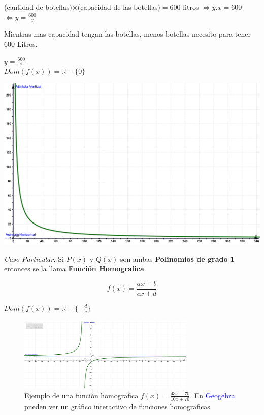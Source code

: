 \documentclass[a4paper,11pt,spanish,sans]{exam}
\begin{document}
(cantidad de botellas)$\times$(capacidad de las botellas)$=600$ litros $\Rightarrow y.x=600$ $\Leftrightarrow y=\frac{600}{x}$

Mientras mas capacidad tengan las botellas, menos botellas necesito para tener $600$ Litros.

\begin{minipage}{0.3\linewidth}

\centering
$y=\frac{600}{x} $\\
$Dom(f(x))=\mathbb{R} - \lbrace 0 \rbrace$\\


\end{minipage}
\begin{minipage}{0.7\linewidth}

\centering
\includegraphics[width= 0.8\linewidth]{inversaej.png}\\

\end{minipage}


\label{homografica}
\emph{Caso Particular:} Si $P(x)$ y $Q(x)$ son ambas \textbf{Polinomios de grado 1} entonces se la llama \textbf{Función Homografica}.

\[f(x) = \frac{a x + b}{c x + d}\]
\begin{flushright}
$Dom(f(x))=\mathbb{R} - \lbrace -\frac{d}{c}\rbrace$
\end{flushright}

\begin{figure}[ht!]
\centering
\includegraphics[width=0.75\textwidth]{homograficaej.png}
\caption{Ejemplo de una función homografica $f(x)=\frac{43x-70}{10x+70}$. En \href{http://tube.geogebra.org/m/1446635}{\textcolor{blue}{Geogebra}} pueden ver un gráfico interactivo de funciones homograficas}
\label{fig:homografica}
\end{figure}
\end{document}
